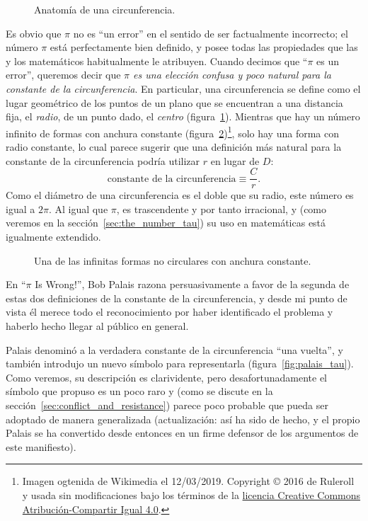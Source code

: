 \begin{figure}
\caption{Anatomía de una circunferencia.\label{fig:circle}}
\end{figure}

Es obvio que $\pi$ no es ``un error'' en el sentido de ser factualmente incorrecto; el número $\pi$ está perfectamente bien definido, y posee todas las propiedades que las y los matemáticos habitualmente le atribuyen. Cuando decimos que ``$\pi$ es un error'', queremos decir que \emph{$\pi$ es una elección confusa y poco natural para la constante de la circunferencia}. En particular, una circunferencia se define como el lugar geométrico de los puntos de un plano que se encuentran a una distancia fija, el \emph{radio}, de un punto dado, el \emph{centro} (figura~\ref{fig:circle}). Mientras que hay un número infinito de formas con anchura constante (figura~\ref{fig:constant_width})\footnote{Imagen ogtenida de Wikimedia el 12/03/2019. Copyright © 2016 de Ruleroll y usada sin modificaciones bajo los términos de la \href{https://creativecommons.org/licenses/by-sa/4.0/deed.es}{licencia Creative Commons Atribución-Compartir Igual 4.0}.}, solo hay una forma con radio constante, lo cual parece sugerir que una definición más natural para la constante de la circunferencia podría utilizar $r$ en lugar de $D$:
\begin{equation}
\label{eq:circle_constant}
\mbox{constante de la circunferencia} \equiv \frac{C}{r}.
\end{equation}
Como el diámetro de una circunferencia es el doble que su radio, este número es igual a $2\pi$. Al igual que $\pi$, es trascendente y por tanto irracional, y (como veremos en la sección~\ref{sec:the_number_tau}) su uso en matemáticas está igualmente extendido.

\begin{figure}
\caption{Una de las infinitas formas no circulares con anchura constante.\label{fig:constant_width}}
\end{figure}

En ``$\pi$ Is Wrong!'', Bob Palais razona persuasivamente a favor de la segunda de estas dos definiciones de la constante de la circunferencia, y desde mi punto de vista él merece todo el reconocimiento por haber identificado el problema y haberlo hecho llegar al público en general.

Palais denominó a la verdadera constante de la circunferencia ``una vuelta'', y también introdujo un nuevo símbolo para representarla (figura~\ref{fig:palais_tau}). Como veremos, su descripción es clarividente, pero desafortunadamente el símbolo que propuso es un poco raro y (como se discute en la sección~\ref{sec:conflict_and_resistance}) parece poco probable que pueda ser adoptado de manera generalizada (actualización: así ha sido de hecho, y el propio Palais se ha convertido desde entonces en un firme defensor de los argumentos de este manifiesto).

